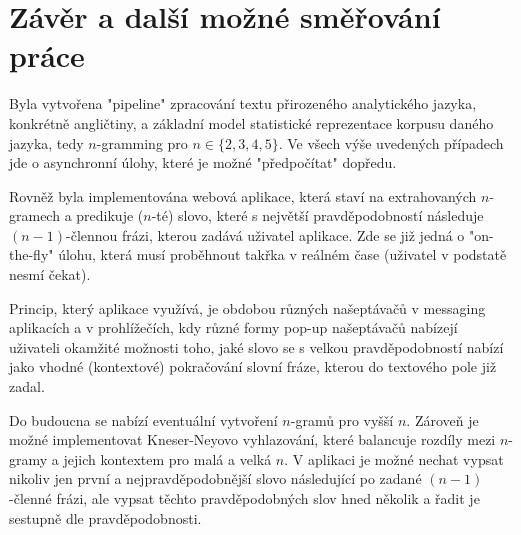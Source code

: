 
\section{Závěr a další možné směřování práce}

Byla vytvořena "pipeline" zpracování textu přirozeného analytického jazyka,
konkrétně angličtiny, a základní model statistické reprezentace
korpusu 
daného jazyka, tedy $n$-gramming pro $n \in \{2, 3, 4, 5\}$.
Ve všech výše
uvedených případech jde o asynchronní úlohy, které je
možné "předpočítat" dopředu.

Rovněž byla implementována webová aplikace, která staví na extrahovaných
\mbox{$n$-gramech} a predikuje ($n$-té) slovo,
které s největší pravděpodobností
následuje $(n - 1)$-člennou frázi, kterou zadává
uživatel aplikace. Zde
se již jedná o "on-the-fly" úlohu, která musí proběhnout
takřka v reálném
čase (uživatel v podstatě nesmí čekat).

Princip, který aplikace využívá, je obdobou různých našeptávačů v messaging
aplikacích a v prohlížečích, kdy různé formy pop-up našeptávačů nabízejí
uživateli okamžité možnosti toho, jaké slovo se s velkou pravděpodobností%
nabízí jako vhodné (kontextové) pokračování slovní fráze, kterou do textového
pole již zadal.

Do budoucna se nabízí eventuální vytvoření $n$-gramů pro vyšší $n$.
Zároveň je možné implementovat Kneser-Neyovo vyhlazování,
které balancuje
rozdíly mezi \mbox{$n$-gramy} a jejich kontextem pro malá a velká $n$.
V aplikaci
je možné nechat vypsat nikoliv jen první a nejpravděpodobnější slovo
následující po zadané $(n - 1)$-členné frázi,
ale vypsat těchto pravděpodobných
slov hned několik a řadit je sestupně dle pravděpodobnosti.


\newpage







